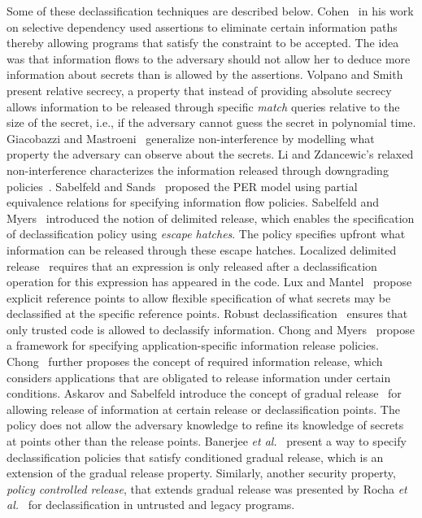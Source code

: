 Some of these declassification techniques are described below.
Cohen~\cite{cohen77,cohen78} in his work on selective
dependency used assertions to eliminate certain information paths
thereby allowing programs that satisfy the constraint to be
accepted. The idea was that information flows to the adversary should
not allow her to deduce more information about secrets than is allowed
by the assertions. Volpano and Smith~\cite{relSec} present relative
secrecy, a property that instead of providing absolute
secrecy allows information to be released through specific
\emph{match} queries relative to the size of the secret, i.e., if the
adversary cannot guess the secret in polynomial time. Giacobazzi and
Mastroeni~\cite{ani} generalize non-interference by modelling what 
property the adversary can observe about the secrets. Li and
Zdancewic's relaxed non-interference characterizes the information
released through downgrading policies~\cite{rel-ni}. Sabelfeld and
Sands~\cite{permodel} proposed the PER model using partial equivalence
relations for specifying information flow policies.
Sabelfeld and Myers~\cite{delRelease} introduced the notion of
delimited release, which enables the specification of declassification
policy using \emph{escape hatches}. The policy specifies upfront what
information can be released through these escape hatches. Localized
delimited release~\cite{ldr} requires that an expression is only released 
after a declassification operation for this expression has appeared
in the code. Lux and Mantel~\cite{Lux} propose explicit reference
points to allow flexible specification of what secrets may be
declassified at the specific reference points. Robust
declassification~\cite{robust} ensures that only trusted code is
allowed to declassify information. Chong and Myers~\cite{chong2004}
propose a framework for specifying application-specific information
release policies. Chong~\cite{rir} further proposes the concept of
required information release, which considers applications that are
obligated to release information under certain conditions. Askarov and 
Sabelfeld introduce the concept of gradual release~\cite{gradRelease}
for allowing release of information at certain release or declassification
points. The policy does not allow the adversary knowledge to refine
its knowledge of secrets at
points other than the release points. Banerjee \emph{et al.}~\cite{cgrSP}
present a way to specify declassification policies 
that satisfy conditioned gradual release, which is an extension of the
gradual release property. Similarly, another security property,
\emph{policy controlled release}, that extends gradual release was
presented by Rocha \emph{et al.}~\cite{rochaSP} for declassification in
untrusted and legacy programs.

